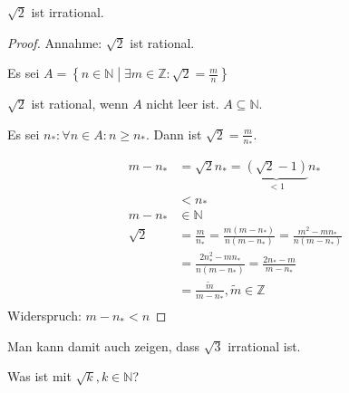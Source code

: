\begin{example}
  $\sqrt{2}$ ist irrational.

  \begin{proof}
    Annahme: $\sqrt{2}$ ist rational.

    Es sei \( A = \left\{ n \in \mathbb{N} \middle| \exists m \in \mathbb{Z}: \sqrt{2} = \frac{m}{n} \right\} \)

    $\sqrt{2}$ ist rational, wenn $A$ nicht leer ist. $A \subseteq \mathbb{N}$.

    Es sei $n_{*}: \forall n \in A: n \ge n_{*}$. Dann ist $\sqrt{2} = \frac{m}{n_{*}}$.

    \begin{align*}
      m-n_{*} &= \sqrt{2}n_{*} = \underbrace{\left( \sqrt{2}-1 \right)}_{< 1}n_{*} \\
      \, &< n_{*} \\
      m-n_{*} &\in \mathbb{N} \\
      \sqrt{2} &= \frac{m}{n_{*}} = \frac{m(m-n_{*})}{n(m-n_{*})} = \frac{m^2-mn_{*}}{n(m-n_{*})} \\
      \, &= \frac{2n_{*}^2-mn_{*}}{n(m-n_{*})} = \frac{2n_{*}-m}{m-n_{*}} \\
      \, &= \frac{\tilde{m}}{m-n_{*}}, \tilde{m} \in \mathbb{Z} \\
    \end{align*}
    Widerspruch: $m-n_{*} < n$
  \end{proof}

  Man kann damit auch zeigen, dass $\sqrt{3}$ irrational ist.

  Was ist mit $\sqrt{k}, k \in \mathbb{N}$?
\end{example}

